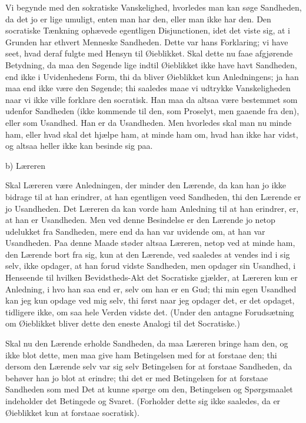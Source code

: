 \documentclass[12pt,a4paper]{article}
\begin{document}
Vi begynde med den sokratiske Vanskelighed, hvorledes man kan søge Sandheden, da det jo er lige umuligt, enten man har den, eller man ikke har den. Den socratiske Tænkning ophævede egentligen Disjunctionen, idet det viste sig, at i Grunden har ethvert Menneske Sandheden. Dette var hans Forklaring; vi have seet, hvad deraf fulgte med Hensyn til Øieblikket. Skal dette nu faae afgjørende Betydning, da maa den Søgende lige indtil Øieblikket ikke have havt Sandheden, end ikke i Uvidenhedens Form, thi da bliver Øieblikket kun Anledningens; ja han maa end ikke være den Søgende; thi saaledes maae vi udtrykke Vanskeligheden naar vi ikke ville forklare den socratisk. Han maa da altsaa være bestemmet som udenfor Sandheden (ikke kommende til den, som Proselyt, men gaaende fra den), eller som Usandhed. Han er da Usandheden. Men hvorledes skal man nu minde ham, eller hvad skal det hjælpe ham, at minde ham om, hvad han ikke har vidst, og altsaa heller ikke kan besinde sig paa.

b) Læreren

Skal Læreren være Anledningen, der minder den Lærende, da kan han jo ikke bidrage til at han erindrer, at han egentligen veed Sandheden, thi den Lærende er jo Usandheden. Det Læreren da kan vorde ham Anledning til at han erindrer, er, at han er Usandheden. Men ved denne Besindelse er den Lærende jo netop udelukket fra Sandheden, mere end da han var uvidende om, at han var Usandheden. Paa denne Maade støder altsaa Læreren, netop ved at minde ham, den Lærende bort fra sig, kun at den Lærende, ved saaledes at vendes ind i sig selv, ikke opdager, at han forud vidste Sandheden, men opdager sin Usandhed, i Henseende til hvilken Bevidstheds-Akt det Socratiske gjælder, at Læreren kun er Anledning, i hvo han saa end er, selv om han er en Gud; thi min egen Usandhed kan jeg kun opdage ved mig selv, thi først naar jeg opdager det, er det opdaget, tidligere ikke, om saa hele Verden vidste det. (Under den antagne Forudsætning om Øieblikket bliver dette den eneste Analogi til det Socratiske.)

Skal nu den Lærende erholde Sandheden, da maa Læreren bringe ham den, og ikke blot dette, men maa give ham Betingelsen med for at forstaae den; thi dersom den Lærende selv var sig selv Betingelsen for at forstaae Sandheden, da behøver han jo blot at erindre; thi det er med Betingelsen for at forstaae Sandheden som med Det at kunne spørge om den, Betingelsen og Spørgsmaalet indeholder det Betingede og Svaret. (Forholder dette sig ikke saaledes, da er Øieblikket kun at forstaae socratisk).
\end{document}
